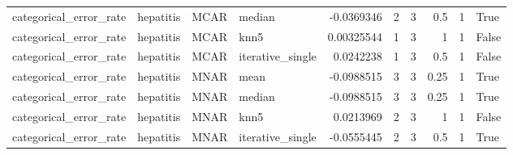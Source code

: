 \begin{table}[ht]
\begin{tabular}{llllrrrrrl}
 categorical\_error\_rate & hepatitis       & MCAR        & median           &     -0.0369346   &                   2 &       3 &      0.5  &        1 & True               \\
 categorical\_error\_rate & hepatitis       & MCAR        & knn5             &      0.00325544  &                   1 &       3 &      1    &        1 & False              \\
 categorical\_error\_rate & hepatitis       & MCAR        & iterative\_single &      0.0242238   &                   1 &       3 &      0.5  &        1 & False              \\
 categorical\_error\_rate & hepatitis       & MNAR        & mean             &     -0.0988515   &                   3 &       3 &      0.25 &        1 & True               \\
 categorical\_error\_rate & hepatitis       & MNAR        & median           &     -0.0988515   &                   3 &       3 &      0.25 &        1 & True               \\
 categorical\_error\_rate & hepatitis       & MNAR        & knn5             &      0.0213969   &                   2 &       3 &      1    &        1 & False              \\
 categorical\_error\_rate & hepatitis       & MNAR        & iterative\_single &     -0.0555445   &                   2 &       3 &      0.5  &        1 & True               \\
\hline
\end{tabular}
\end{table}
